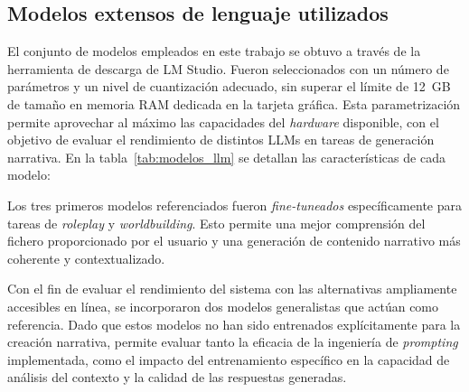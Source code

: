 \subsection{Modelos extensos de lenguaje utilizados}\label{subsec:modelos-llm}
El conjunto de modelos empleados en este trabajo se obtuvo a través de la herramienta de descarga de LM Studio.
Fueron seleccionados con un número de parámetros y un nivel de cuantización adecuado,
sin superar el límite de 12~GB de tamaño en memoria RAM dedicada en la tarjeta gráfica.
Esta parametrización permite aprovechar al máximo las capacidades del \textit{hardware} disponible,
con el objetivo de evaluar el rendimiento de distintos LLMs en tareas de generación narrativa.
En la tabla~\ref{tab:modelos_llm} se detallan las características de cada modelo:

\begin{table}[h]
\centering
\caption{Modelos extensos de lenguaje utilizados en el trabajo.}
\label{tab:modelos_llm}
\end{table}

Los tres primeros modelos referenciados fueron \textit{fine-tuneados} específicamente para tareas de \textit{roleplay} y \textit{worldbuilding}.
Esto permite una mejor comprensión del fichero proporcionado por el usuario y una generación de contenido narrativo más coherente y contextualizado.

Con el fin de evaluar el rendimiento del sistema con las alternativas ampliamente accesibles en línea,
se incorporaron dos modelos generalistas que actúan como referencia.
Dado que estos modelos no han sido entrenados explícitamente para la creación narrativa,
permite evaluar tanto la eficacia de la ingeniería de \textit{prompting} implementada,
como el impacto del entrenamiento específico en la capacidad de análisis del contexto y la calidad de las respuestas generadas.

